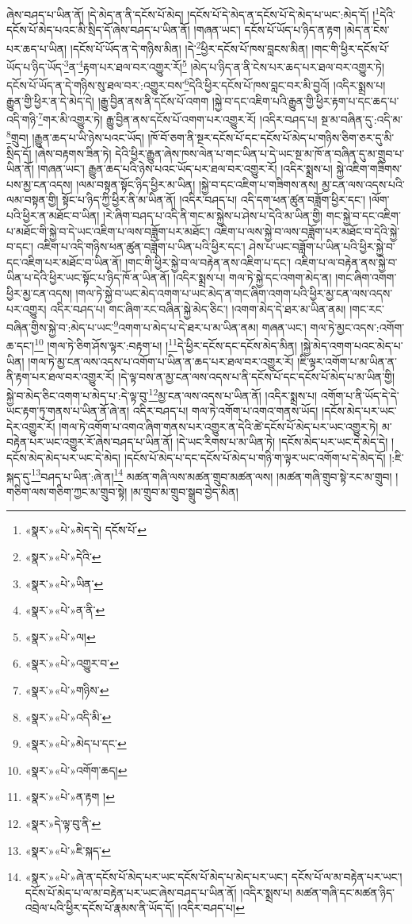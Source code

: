ཞེས་བཤད་པ་ཡིན་ནོ། །དེ་མེད་ན་ནི་དངོས་པོ་མེད། །དངོས་པོ་དེ་མེད་ན་དངོས་པོ་དེ་མེད་པ་ཡང་:མེད་དོ། །\footnote{«སྣར་»«པེ་»མེད་དེ། དངོས་པོ་}དེའི་དངོས་པོ་མེད་པའང་མི་སྲིད་དོ་ཞེས་བཤད་པ་ཡིན་ནོ། །གཞན་ཡང་། དངོས་པོ་ཡོད་པ་ཉིད་ན་རྟག །མེད་ན་ངེས་པར་ཆད་པ་ཡིན། །དངོས་པོ་ཡོད་ན་དེ་གཉིས་མིན། །དེ་\footnote{«སྣར་»«པེ་»དེའི་}ཕྱིར་དངོས་པོ་ཁས་བླངས་མིན། །གང་གི་ཕྱིར་དངོས་པོ་ཡོད་པ་ཉིད་ཡོད་\footnote{«སྣར་»«པེ་»ཡིན་}ན་\footnote{«སྣར་»«པེ་»ན་ནི་}རྟག་པར་ཐལ་བར་འགྱུར་རོ།\footnote{«སྣར་»«པེ་»ལ།} །མེད་པ་ཉིད་ན་ནི་ངེས་པར་ཆད་པར་ཐལ་བར་འགྱུར་ཏེ། དངོས་པོ་ཡོད་ན་དེ་གཉིས་སུ་ཐལ་བར་:འགྱུར་བས་\footnote{«སྣར་»«པེ་»འགྱུར་བ་}དེའི་ཕྱིར་དངོས་པོ་ཁས་བླང་བར་མི་བྱའོ། །འདིར་སྨྲས་པ། རྒྱུན་གྱི་ཕྱིར་ན་དེ་མེད་དེ། །རྒྱུ་བྱིན་ནས་ནི་དངོས་པོ་འགག །སྐྱེ་བ་དང་འཇིག་པའི་རྒྱུན་གྱི་ཕྱིར་རྟག་པ་དང་ཆད་པ་འདི་གཉི་\footnote{«སྣར་»«པེ་»གཉིས་}གར་མི་འགྱུར་ཏེ། རྒྱུ་བྱིན་ནས་དངོས་པོ་འགག་པར་འགྱུར་རོ། །འདིར་བཤད་པ། སྔ་མ་བཞིན་དུ་:འདི་མ་\footnote{«སྣར་»«པེ་»འདི་མི་}གྲུབ། །རྒྱུན་ཆད་པ་ཡི་ཉེས་པའང་ཡོད། །ཁོ་བོ་ཅག་ནི་སྔར་དངོས་པོ་དང་དངོས་པོ་མེད་པ་གཉིས་ཅིག་ཅར་དུ་མི་སྲིད་དོ། །ཞེས་བརྟགས་ཟིན་ཏེ། དེའི་ཕྱིར་རྒྱུན་ཞེས་ཁས་ལེན་པ་གང་ཡིན་པ་དེ་ཡང་སྔ་མ་ཁོ་ན་བཞིན་དུ་མ་གྲུབ་པ་ཡིན་ནོ། །གཞན་ཡང་། རྒྱུན་ཆད་པའི་ཉེས་པའང་ཡོད་པར་ཐལ་བར་འགྱུར་རོ། །འདིར་སྨྲས་པ། སྐྱེ་འཇིག་གཟིགས་པས་མྱ་ངན་འདས། །ལམ་བསྟན་སྟོང་ཉིད་ཕྱིར་མ་ཡིན། །སྐྱེ་བ་དང་འཇིག་པ་གཟིགས་ནས། མྱ་ངན་ལས་འདས་པའི་ལམ་བསྟན་གྱི། སྟོང་པ་ཉིད་ཀྱི་ཕྱིར་ནི་མ་ཡིན་ནོ། །འདིར་བཤད་པ། འདི་དག་ཕན་ཚུན་བཟློག་ཕྱིར་དང་། །ལོག་པའི་ཕྱིར་ན་མཐོང་བ་ཡིན། །རེ་ཞིག་བཤད་པ་འདི་ནི་གང་མ་སྐྱེས་པ་ཤེས་པ་དེའི་མ་ཡིན་གྱི། གང་སྐྱེ་བ་དང་འཇིག་པ་མཐོང་གི་སྐྱེ་བ་དེ་ཡང་འཇིག་པ་ལས་བཟློག་པར་མཐོང་། འཇིག་པ་ལས་སྐྱེ་བ་ལས་བཟློག་པར་མཐོང་བ་དེའི་སྐྱེ་བ་དང་། འཇིག་པ་འདི་གཉིས་ཕན་ཚུན་བཟློག་པ་ཡིན་པའི་ཕྱིར་དང་། ཤེས་པ་ཡང་བཟློག་པ་ཡིན་པའི་ཕྱིར་སྐྱེ་བ་དང་འཇིག་པར་མཐོང་བ་ཡིན་ནོ། །གང་གི་ཕྱིར་སྐྱེ་བ་ལ་བརྟེན་ནས་འཇིག་པ་དང་། འཇིག་པ་ལ་བརྟེན་ནས་སྐྱེ་བ་ཡིན་པ་དེའི་ཕྱིར་ཡང་སྟོང་པ་ཉིད་ཁོ་ན་ཡིན་ནོ། །འདིར་སྨྲས་པ། གལ་ཏེ་སྐྱེ་དང་འགག་མེད་ན། །གང་ཞིག་འགག་ཕྱིར་མྱ་ངན་འདས། །གལ་ཏེ་སྐྱེ་བ་ཡང་མེད་འགག་པ་ཡང་མེད་ན་གང་ཞིག་འགག་པའི་ཕྱིར་མྱ་ངན་ལས་འདས་པར་འགྱུར། འདིར་བཤད་པ། གང་ཞིག་རང་བཞིན་སྐྱེ་མེད་ཅིང་། །འགག་མེད་དེ་ཐར་མ་ཡིན་ནམ། །གང་རང་བཞིན་གྱིས་སྐྱེ་བ་:མེད་པ་ཡང་\footnote{«སྣར་»«པེ་»མེད་པ་དང་}འགག་པ་མེད་པ་དེ་ཐར་པ་མ་ཡིན་ནམ། གཞན་ཡང་། གལ་ཏེ་མྱང་འདས་:འགོག་ཆ་དང་།\footnote{«སྣར་»«པེ་»འགོག་ཆད།} །གལ་ཏེ་ཅིག་ཤོས་ལྟར་:བརྟག་པ། །\footnote{«སྣར་»«པེ་»ན་རྟག །}དེ་ཕྱིར་དངོས་དང་དངོས་མེད་མིན། །སྐྱེ་མེད་འགག་པའང་མེད་པ་ཡིན། །གལ་ཏེ་མྱ་ངན་ལས་འདས་པ་འགོག་པ་ཡིན་ན་ཆད་པར་ཐལ་བར་འགྱུར་རོ། །ཇི་ལྟར་འགོག་པ་མ་ཡིན་ན་ནི་རྟག་པར་ཐལ་བར་འགྱུར་རོ། །དེ་ལྟ་བས་ན་མྱ་ངན་ལས་འདས་པ་ནི་དངོས་པོ་དང་དངོས་པོ་མེད་པ་མ་ཡིན་གྱི། སྐྱེ་བ་མེད་ཅིང་འགག་པ་མེད་པ་:དེ་ལྟ་བུ་\footnote{«སྣར་»དེ་ལྟ་བུ་ནི་}མྱ་ངན་ལས་འདས་པ་ཡིན་ནོ། །འདིར་སྨྲས་པ། འགོག་པ་ནི་ཡོད་དེ་དེ་ཡང་རྟག་ཏུ་གནས་པ་ཡིན་ནོ་ཞེ་ན། འདིར་བཤད་པ། གལ་ཏེ་འགོག་པ་འགའ་གནས་ཡོད། །དངོས་མེད་པར་ཡང་དེར་འགྱུར་རོ། །གལ་ཏེ་འགོག་པ་འགའ་ཞིག་གནས་པར་འགྱུར་ན་དེའི་ཚེ་དངོས་པོ་མེད་པར་ཡང་འགྱུར་ཏེ། མ་བརྟེན་པར་ཡང་འགྱུར་རོ་ཞེས་བཤད་པ་ཡིན་ནོ། །དེ་ཡང་རིགས་པ་མ་ཡིན་ཏེ། །དངོས་མེད་པར་ཡང་དེ་མེད་དེ། །དངོས་མེད་མེད་པར་ཡང་དེ་མེད། །དངོས་པོ་མེད་པ་དང་དངོས་པོ་མེད་པ་གཉི་ག་ལྟར་ཡང་འགོག་པ་དེ་མེད་དོ། །:ཇི་སྐད་དུ་\footnote{«སྣར་»«པེ་»ཇི་སྐད་}བཤད་པ་ཡིན་:ཞེ་ན།\footnote{«སྣར་»«པེ་»ཞེ་ན་དངོས་པོ་མེད་པར་ཡང་དངོས་པོ་མེད་པ་མེད་པར་ཡང་། དངོས་པོ་ལ་མ་བརྟེན་པར་ཡང་། དངོས་པོ་མེད་པ་ལ་མ་བརྟེན་པར་ཡང་ཞེས་བཤད་པ་ཡིན་ནོ། །འདིར་སྨྲས་པ། མཚན་གཞི་དང་མཚན་ཉིད་འབྲེལ་པའི་ཕྱིར་དངོས་པོ་རྣམས་ནི་ཡོད་དོ། །འདིར་བཤད་པ།} མཚན་གཞི་ལས་མཚན་གྲུབ་མཚན་ལས། །མཚན་གཞི་གྲུབ་སྟེ་རང་མ་གྲུབ། །གཅིག་ལས་གཅིག་ཀྱང་མ་གྲུབ་སྟེ། །མ་གྲུབ་མ་གྲུབ་སྒྲུབ་བྱེད་མིན། 